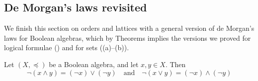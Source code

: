 \subsection*{De Morgan's laws revisited}

We finish this section on orders and lattices with a general version of de Morgan's laws for Boolean algebras, which by Theorems  implies the versions we proved for logical formulae () and for sets ((a)--(b)).



\begin{theorem}
\label{thmDeMorgan}
Let $(X, \preceq)$ be a Boolean algebra, and let $x,y \in X$. Then
\[ \neg (x \wedge y) = (\neg x) \vee (\neg y) \quad \text{and} \quad \neg (x \vee y) = (\neg x) \wedge (\neg y) \]
\end{theorem}
